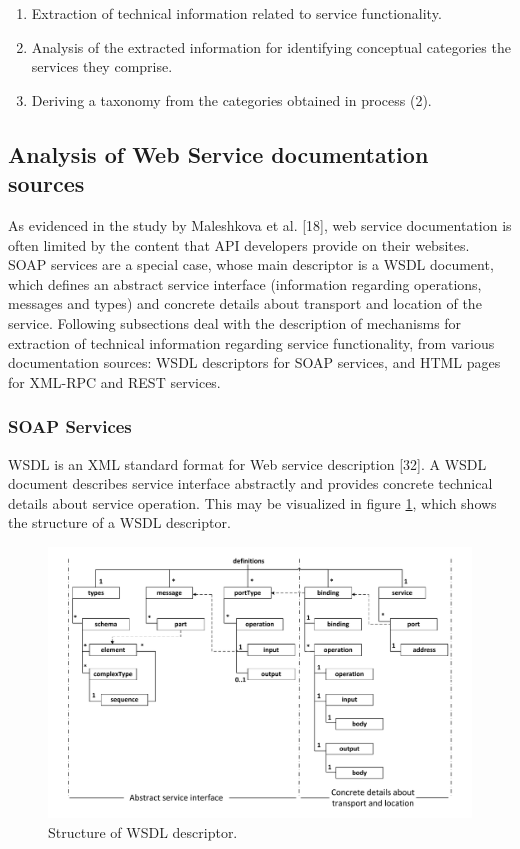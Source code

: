 \begin{enumerate}
 \item Extraction of technical information related to service functionality.
 \item Analysis of the extracted information for identifying conceptual categories the
services they comprise.
 \item Deriving a taxonomy from the categories obtained in process (2).
\end{enumerate}

\subsection{Analysis of Web Service documentation sources}
\label{subsec:analysis-ws-doc}
As evidenced in the study by Maleshkova et al. [18], web service documentation is often limited by the content that API developers provide on their websites. SOAP services are a special case, whose main descriptor is a WSDL document, which defines an abstract service interface (information regarding operations, messages and types) and concrete details about transport and location of the service. Following subsections deal with the description of mechanisms for extraction of technical information regarding service functionality, from various documentation sources: WSDL descriptors for SOAP services, and HTML pages for XML-RPC and REST services.

\subsubsection{SOAP Services}
\label{subsubsec:soap}
WSDL is an XML standard format for Web service description [32]. A WSDL document describes service interface abstractly and provides concrete technical details about service operation. This may be visualized in figure \ref{wsdl-Structure}, which shows the structure of a WSDL descriptor.

\begin{figure}
\includegraphics[scale=0.45]{images/wsdl-structure-en}

\caption{Structure of WSDL descriptor.}
\label{wsdl-Structure}
\end{figure}

